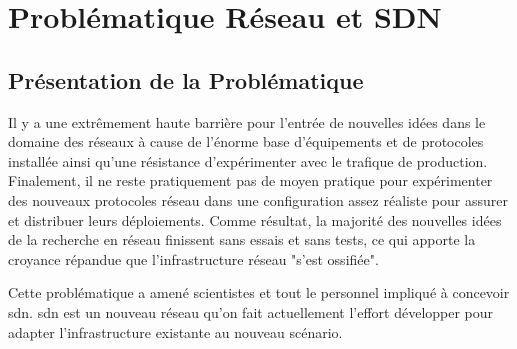 \chapter{Problématique Réseau et SDN}
\label{chap-1}



\section{Présentation de la Problématique}

Il y a une extrêmement haute barrière pour l'entrée de nouvelles idées dans le domaine des réseaux à cause de l'énorme base d'équipements et de protocoles installée ainsi qu'une résistance d'expérimenter avec le trafique de production. Finalement, il ne reste pratiquement pas de moyen pratique pour expérimenter des nouveaux protocoles réseau dans une configuration assez réaliste pour assurer et distribuer leurs déploiements. Comme résultat, la majorité des nouvelles idées de la recherche en réseau finissent sans essais et sans tests, ce qui apporte la croyance répandue que l'infrastructure réseau "s'est ossifiée". \cite{OpenFlowStanford} \par
Cette problématique a amené scientistes et tout le personnel impliqué à concevoir \gls{sdn}. \gls{sdn} est un nouveau  réseau qu'on fait actuellement l'effort développer pour adapter l'infrastructure existante au nouveau scénario.